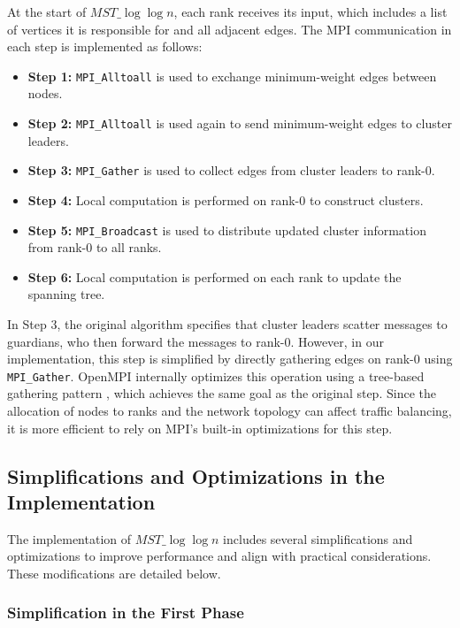 \documentclass[english, 12pt, a4paper, elec, utf8, a-2b, online]{aaltothesis}
\newcommand{\mstalgo}{$MST\_\log\log{n}$}
\begin{document}
At the start of \mstalgo{}, each rank receives its input, which includes a list of vertices it is responsible for and all adjacent edges. The MPI communication in each step is implemented as follows:
\begin{itemize}
	\item \textbf{Step 1:} \texttt{MPI\_Alltoall} is used to exchange minimum-weight edges between nodes.
	\item \textbf{Step 2:} \texttt{MPI\_Alltoall} is used again to send minimum-weight edges to cluster leaders.
	\item \textbf{Step 3:} \texttt{MPI\_Gather} is used to collect edges from cluster leaders to rank-0.
	\item \textbf{Step 4:} Local computation is performed on rank-0 to construct clusters.
	\item \textbf{Step 5:} \texttt{MPI\_Broadcast} is used to distribute updated cluster information from rank-0 to all ranks.
	\item \textbf{Step 6:} Local computation is performed on each rank to update the spanning tree.
\end{itemize}

In Step 3, the original algorithm specifies that cluster leaders scatter messages to guardians, who then forward the messages to rank-0. However, in our implementation, this step is simplified by directly gathering edges on rank-0 using \texttt{MPI\_Gather}. OpenMPI internally optimizes this operation using a tree-based gathering pattern \cite{MPICollective} \cite{OpenMPIRepoGather}, which achieves the same goal as the original step. Since the allocation of nodes to ranks and the network topology can affect traffic balancing, it is more efficient to rely on MPI's built-in optimizations for this step.

\subsection{Simplifications and Optimizations in the Implementation}

The implementation of \mstalgo{} includes several simplifications and optimizations to improve performance and align with practical considerations. These modifications are detailed below.

\subsubsection{Simplification in the First Phase}
\end{document}
